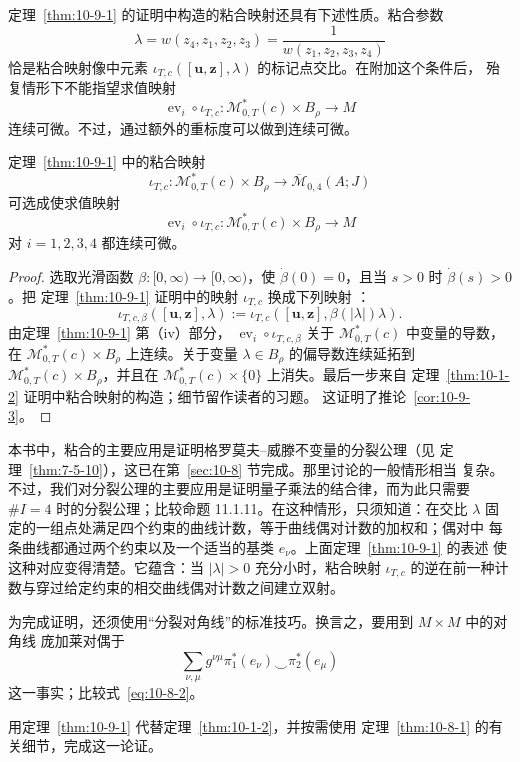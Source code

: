 定理~\ref{thm:10-9-1} 的证明中构造的粘合映射还具有下述性质。粘合参数
\begin{equation}\label{eq:10-9-3}
  \lambda=w(z_4,z_1,z_2,z_3)
  =\frac1{w(z_1,z_2,z_3,z_4)}
\end{equation}
恰是粘合映射像中元素
$\iota_{T,c}([\mathbf u,\mathbf z],\lambda)$ 的标记点交比。在附加这个条件后，
殆复情形下不能指望求值映射
\[
  \operatorname{ev}_i\circ\iota_{T,c}:
  \mathcal M_{0,T}^*(c)\times B_\rho\longrightarrow M
\]
连续可微。不过，通过额外的重标度可以做到连续可微。

\begin{corollary}\label{cor:10-9-3}
定理~\ref{thm:10-9-1} 中的粘合映射
\[
  \iota_{T,c}:\mathcal M_{0,T}^*(c)\times B_\rho
  \longrightarrow\overline{\mathcal M}_{0,4}(A;J)
\]
可选成使求值映射
\[
  \operatorname{ev}_i\circ\iota_{T,c}:
  \mathcal M_{0,T}^*(c)\times B_\rho\longrightarrow M
\]
对 $i=1,2,3,4$ 都连续可微。
\end{corollary}

\begin{proof}
选取光滑函数 $\beta:[0,\infty)\to[0,\infty)$，使
$\dot\beta(0)=0$，且当 $s>0$ 时 $\dot\beta(s)>0$。把
定理~\ref{thm:10-9-1} 证明中的映射 $\iota_{T,c}$ 换成下列映射
：
\[
  \iota_{T,c,\beta}([\mathbf u,\mathbf z],\lambda)
  :=\iota_{T,c}([\mathbf u,\mathbf z],\beta(|\lambda|)\lambda).
\]
由定理~\ref{thm:10-9-1} 第（iv）部分，
$\operatorname{ev}_i\circ\iota_{T,c,\beta}$ 关于
$\mathcal M_{0,T}^*(c)$ 中变量的导数，在
$\mathcal M_{0,T}^*(c)\times B_\rho$ 上连续。关于变量
$\lambda\in B_\rho$ 的偏导数连续延拓到
$\mathcal M_{0,T}^*(c)\times B_\rho$，并且在
$\mathcal M_{0,T}^*(c)\times\{0\}$ 上消失。最后一步来自
定理~\ref{thm:10-1-2} 证明中粘合映射的构造；细节留作读者的习题。
这证明了推论~\ref{cor:10-9-3}。
\end{proof}

本书中，粘合的主要应用是证明格罗莫夫--威滕不变量的分裂公理（见
定理~\ref{thm:7-5-10}），这已在第~\ref{sec:10-8} 节完成。那里讨论的一般情形相当
复杂。不过，我们对分裂公理的主要应用是证明量子乘法的结合律，而为此只需要
$\#I=4$ 时的分裂公理；比较命题 11.1.11。在这种情形，只须知道：在交比
$\lambda$ 固定的一组点处满足四个约束的曲线计数，等于曲线偶对计数的加权和；偶对中
每条曲线都通过两个约束以及一个适当的基类 $e_\nu$。上面定理~\ref{thm:10-9-1} 的表述
使这种对应变得清楚。它蕴含：当 $|\lambda|>0$ 充分小时，粘合映射
$\iota_{T,c}$ 的逆在前一种计数与穿过给定约束的相交曲线偶对计数之间建立双射。

为完成证明，还须使用“分裂对角线”的标准技巧。换言之，要用到 $M\times M$ 中的对角线
庞加莱对偶于
\[
  \sum_{\nu,\mu}g^{\nu\mu}\pi_1^*(e_\nu)\smile\pi_2^*(e_\mu)
\]
这一事实；比较式~\eqref{eq:10-8-2}。

\begin{exercise}\label{ex:10-9-4}
用定理~\ref{thm:10-9-1} 代替定理~\ref{thm:10-1-2}，并按需使用
定理~\ref{thm:10-8-1} 的有关细节，完成这一论证。
\end{exercise}
